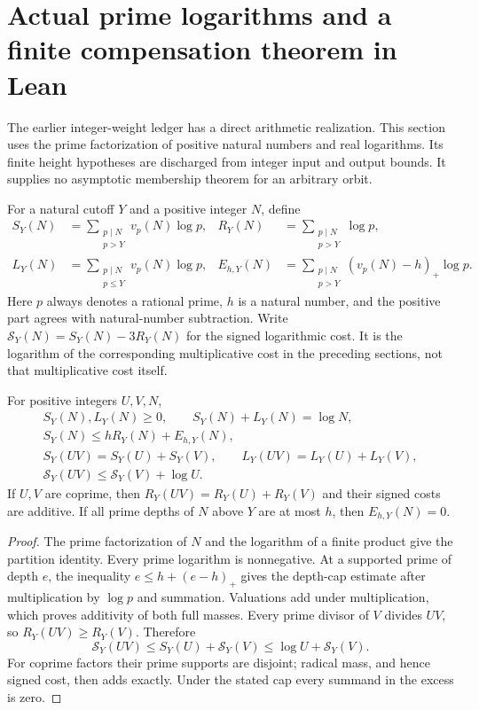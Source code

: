 \section{Actual prime logarithms and a finite compensation theorem in Lean}
\label{apl-section}

The earlier integer-weight ledger has a direct arithmetic realization.
This section uses the prime factorization of positive natural numbers
and real logarithms. Its finite height hypotheses are discharged from
integer input and output bounds. It supplies no asymptotic membership
theorem for an arbitrary orbit.

For a natural cutoff $Y$ and a positive integer $N$, define
\begin{align*}
 S_Y(N)&=\sum_{\substack{p\mid N\\p>Y}}v_p(N)\log p,&
 R_Y(N)&=\sum_{\substack{p\mid N\\p>Y}}\log p,\\
 L_Y(N)&=\sum_{\substack{p\mid N\\p\le Y}}v_p(N)\log p,&
 E_{h,Y}(N)&=\sum_{\substack{p\mid N\\p>Y}}(v_p(N)-h)_+\log p.
\end{align*}
Here $p$ always denotes a rational prime, $h$ is a natural number,
and the positive part agrees with natural-number subtraction. Write
$\mathcal S_Y(N)=S_Y(N)-3R_Y(N)$ for the signed logarithmic cost.
It is the logarithm of the corresponding multiplicative cost in the
preceding sections, not that multiplicative cost itself.

\begin{lemma}\label{apl-ledger}
For positive integers $U,V,N$,
\begin{gather*}
 S_Y(N),L_Y(N)\ge0,\qquad S_Y(N)+L_Y(N)=\log N,\\
 S_Y(N)\le hR_Y(N)+E_{h,Y}(N),\\
 S_Y(UV)=S_Y(U)+S_Y(V),\qquad
 L_Y(UV)=L_Y(U)+L_Y(V),\\
 \mathcal S_Y(UV)\le\mathcal S_Y(V)+\log U.
\end{gather*}
If $U,V$ are coprime, then $R_Y(UV)=R_Y(U)+R_Y(V)$
and their signed costs are additive. If all prime depths of $N$
above $Y$ are at most $h$, then $E_{h,Y}(N)=0$.
\end{lemma}
\begin{proof}
The prime factorization of $N$ and the logarithm of a finite product
give the partition identity. Every prime logarithm is nonnegative.
At a supported prime of depth $e$, the inequality
$e\le h+(e-h)_+$ gives the depth-cap estimate after multiplication
by $\log p$ and summation. Valuations add under multiplication,
which proves additivity of both full masses. Every prime divisor
of $V$ divides $UV$, so $R_Y(UV)\ge R_Y(V)$. Therefore
\[
 \mathcal S_Y(UV)\le S_Y(U)+\mathcal S_Y(V)
                       \le\log U+\mathcal S_Y(V).
\]
For coprime factors their prime supports are disjoint; radical mass,
and hence signed cost, then adds exactly. Under the stated cap every
summand in the excess is zero.
\end{proof}


